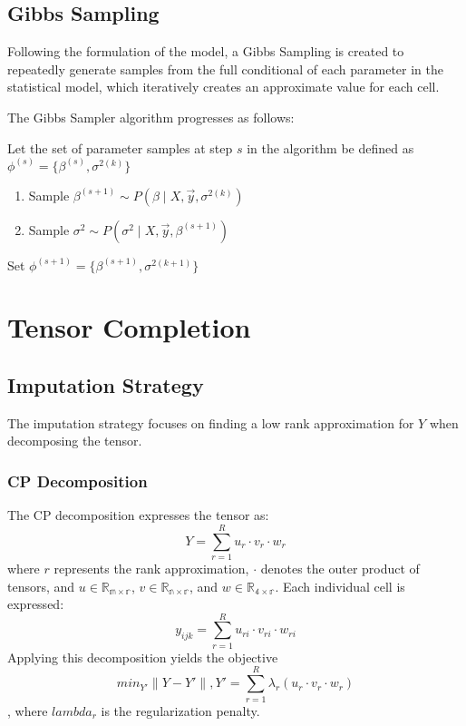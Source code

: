 \documentclass[12pt,twoside]{dukestatscithesis}
\theoremstyle{definition}
\theoremstyle{definition}
\theoremstyle{definition}
\theoremstyle{remark}
\begin{document}
\section{Gibbs Sampling}\label{gibbs-sampling}

Following the formulation of the model, a Gibbs Sampling is created to
repeatedly generate samples from the full conditional of each parameter
in the statistical model, which iteratively creates an approximate value
for each cell.

The Gibbs Sampler algorithm progresses as follows:

Let the set of parameter samples at step \(s\) in the algorithm be
defined as \(\phi^{(s)} = \{\beta^{(s)}, \sigma^{2(k)}\}\)
\begin{enumerate}
\def\labelenumi{\arabic{enumi}.}
\item
  Sample \(\beta^{(s+1)} \sim P(\beta \mid X, \vec{y}, \sigma^{2(k)})\)
\item
  Sample \(\sigma^2 \sim P(\sigma^2 \mid X, \vec{y}, \beta^{(s+1)})\)
\end{enumerate}
Set \(\phi^{(s+1)} = \{\beta^{(s+1)}, \sigma^{2(k+1)}\}\)

\chapter{Tensor Completion}\label{tensor-completion}

\section{Imputation Strategy}\label{imputation-strategy}

The imputation strategy focuses on finding a low rank approximation for
\(Y\) when decomposing the tensor.

\subsection{CP Decomposition}\label{cp-decomposition}

The CP decomposition expresses the tensor as:
\[Y = \sum_{r=1}^Ru_r \cdotp v_r \cdotp w_r\] where \(r\) represents the
rank approximation, \(\cdotp\) denotes the outer product of tensors, and
\(u \in \mathbb{R_{m \times r}}\), \(v \in \mathbb{R_{n \times r}}\),
and \(w \in \mathbb{R_{4 \times r}}\). Each individual cell is
expressed: \[y_{ijk} = \sum_{r=1}^Ru_{ri} \cdotp v_{ri} \cdotp w_{ri}\]
Applying this decomposition yields the objective
\[min_{Y'}\|Y-Y'\|, Y' = \sum_{r=1}^R\lambda_r(u_r \cdotp v_r \cdotp w_r)\],
where \(lambda_r\) is the regularization penalty.
\end{document}
